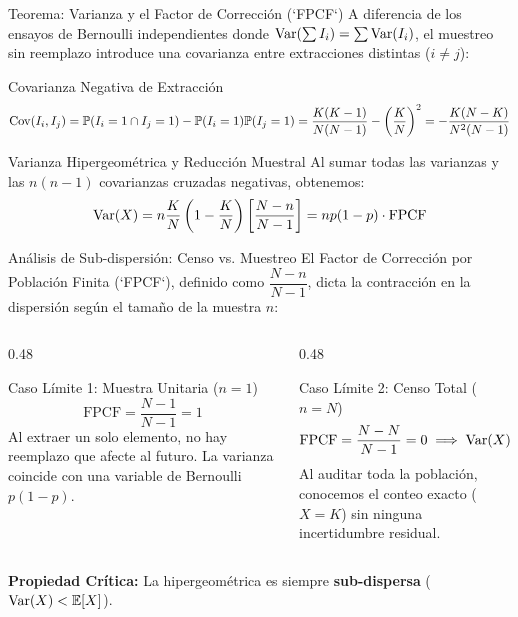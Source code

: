 \documentclass[10pt, aspectratio=169]{beamer}
\begin{document}
\begin{frame}{Teorema: Varianza y el Factor de Corrección (`FPCF`)}
  \footnotesize
  A diferencia de los ensayos de Bernoulli independientes donde $\operatorname{Var}(\sum I_i) = \sum \operatorname{Var}(I_i)$, el muestreo sin reemplazo introduce una covarianza entre extracciones distintas ($i \neq j$): \pause

  \vspace{0.08cm}
  \begin{block}{Covarianza Negativa de Extracción}
    $$\operatorname{Cov}(I_i, I_j) = \mathbb{P}(I_i=1 \cap I_j=1) - \mathbb{P}(I_i=1)\mathbb{P}(I_j=1) = \dfrac{K(K-1)}{N(N-1)} - \left(\dfrac{K}{N}\right)^2 = -\dfrac{K(N-K)}{N^2(N-1)}$$
  \end{block}

  \vspace{0.08cm}
  \pause
  \begin{alertblock}{Varianza Hipergeométrica y Reducción Muestral}
    Al sumar todas las varianzas y las $n(n-1)$ covarianzas cruzadas negativas, obtenemos:
    $$\operatorname{Var}(X) = n \dfrac{K}{N} \left(1 - \dfrac{K}{N}\right) \left[ \dfrac{N-n}{N-1} \right] = np(1-p) \cdot \mathbf{\text{FPCF}}$$
  \end{alertblock}
\end{frame}

\begin{frame}{Análisis de Sub-dispersión: Censo vs. Muestreo}
  \footnotesize
  El Factor de Corrección por Población Finita (`FPCF`), definido como $\dfrac{N-n}{N-1}$, dicta la contracción en la dispersión según el tamaño de la muestra $n$: \pause

  \vspace{0.1cm}
  \begin{columns}[T]
    \begin{column}{0.48\textwidth}
      \begin{block}{Caso Límite 1: Muestra Unitaria ($n=1$)}
        $$\text{FPCF} = \dfrac{N-1}{N-1} = 1$$
        Al extraer un solo elemento, no hay reemplazo que afecte al futuro. La varianza coincide con una variable de Bernoulli $p(1-p)$.
      \end{block}
    \end{column}
    \begin{column}{0.48\textwidth}
      \begin{alertblock}{Caso Límite 2: Censo Total ($n=N$)}
        $$\text{FPCF} = \dfrac{N-N}{N-1} = 0 \implies \operatorname{Var}(X) = 0$$
        Al auditar toda la población, conocemos el conteo exacto ($X=K$) sin ninguna incertidumbre residual.
      \end{alertblock}
    \end{column}
  \end{columns}

  \vspace{0.15cm}
  \pause
  \begin{center}
    \scriptsize\textbf{Propiedad Crítica:} La hipergeométrica es siempre \textbf{sub-dispersa} ($\operatorname{Var}(X) < \mathbb{E}[X]$).
  \end{center}
\end{frame}
\end{document}

